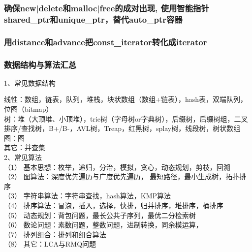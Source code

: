 \subsubsection{确保new|delete和malloc|free的成对出现,
使用智能指针shared_ptr和unique_ptr，替代auto_ptr容器}
\subsubsection{用distance和advance把const_iterator转化成iterator}

\subsubsection{数据结构与算法汇总}

1、常见数据结构

线性：数组，链表，队列，堆栈，块状数组（数组+链表），hash表，双端队列，位图（bitmap）\\
树：堆（大顶堆、小顶堆），trie树（字母树or字典树），后缀树，后缀树组，二叉排序/查找树，B+/B-，AVL树，Treap，红黑树，splay树，线段树，树状数组
图：图\\
其它：并查集\\

2、常见算法\\
（1）       基本思想：枚举，递归，分治，模拟，贪心，动态规划，剪枝，回溯\\
（2）       图算法：深度优先遍历与广度优先遍历， 最短路径，最小生成树，拓扑排序\\
（3）       字符串算法：字符串查找，hash算法，KMP算法\\
（4）       排序算法：冒泡，插入，选择，快排，归并排序，堆排序，桶排序\\
（5）       动态规划：背包问题，最长公共子序列，最优二分检索树\\
（6）       数论问题：素数问题，整数问题，进制转换，同余模运算，\\
（7）       排列组合：排列和组合算法\\
（8）       其它：LCA与RMQ问题